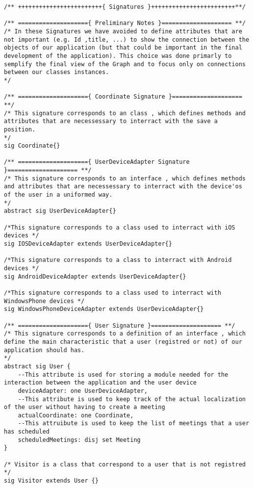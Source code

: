 \documentclass[a4paper,leqno]{book}
\begin{document}
\begin{lstlisting}
/** ++++++++++++++++++++++++{ Signatures }++++++++++++++++++++++++**/

/** ===================={ Preliminary Notes }==================== **/
/* In these Signatures we have avoided to define attributes that are not important (e.g. Id ,title, ...) to show the connection between the objects of our application (but that could be important in the final development of the application). This choice was done primarly to semplify the final view of the Graph and to focus only on connections between our classes instances.
*/

/** ===================={ Coordinate Signature }==================== **/
/* This signature corresponds to an class , which defines methods and attributes that are necessessary to interract with the save a position.
*/
sig Coordinate{}

/** ===================={ UserDeviceAdapter Signature }==================== **/
/* This signature corresponds to an interface , which defines methods and attributes that are necessessary to interract with the device'os of the user in a uniformed way.
*/
abstract sig UserDeviceAdapter{}

/*This signature corresponds to a class used to interract with iOS devices */
sig IOSDeviceAdapter extends UserDeviceAdapter{}

/*This signature corresponds to a class to interract with Android devices */
sig AndroidDeviceAdapter extends UserDeviceAdapter{}

/*This signature corresponds to a class used to interract with WindowsPhone devices */
sig WindowsPhoneDeviceAdapter extends UserDeviceAdapter{}

/** ===================={ User Signature }==================== **/
/* This signature corresponds to a definition of an interface , which define the main characteristic that a user (registred or not) of our application should has.
*/
abstract sig User {
	--This attribute is used for storing a module needed for the interaction between the application and the user device
	deviceAdapter: one UserDeviceAdapter,
	--This attribute is used to keep track of the actual localization of the user without having to create a meeting
	actualCoordinate: one Coordinate,
	--This attruibute is used to keep the list of meetings that a user has scheduled
	scheduledMeetings: disj set Meeting
}

/* Visitor is a class that correspond to a user that is not registred
*/
sig Visitor extends User {}


\end{lstlisting}
\end{document}
